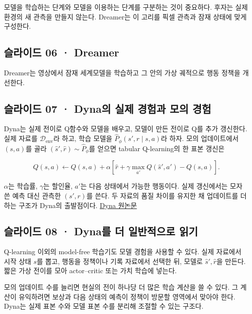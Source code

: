 \documentclass[11pt,a4paper]{article}
\begin{document}
모델을 학습하는 단계와 모델을 이용하는 단계를 구분하는 것이 중요하다. 후자는 실제 환경의 새 관측을 만들지 않는다. Dreamer는 이 고리를 픽셀 관측과 잠재 상태에 맞게 구성한다.\par

\subsection{슬라이드 06 · Dreamer}

Dreamer는 영상에서 잠재 세계모델을 학습하고 그 안의 가상 궤적으로 행동 정책을 개선한다.\par

\subsection{슬라이드 07 · Dyna의 실제 경험과 모의 경험}

Dyna는 실제 전이로 Q함수와 모델을 배우고, 모델이 만든 전이로 Q를 추가 갱신한다. 실제 자료를 $\mathcal D_{\mathrm{env}}$라 하고, 학습 모델을 $\hat P_\phi(s',r\mid s,a)$라 하자. 모의 업데이트에서 $(s,a)$를 골라 $(\hat s',\hat r)\sim\hat P_\phi$를 얻으면 tabular Q-learning의 한 표본 갱신은\par

\[
Q(s,a)\leftarrow Q(s,a)+\alpha
\left[\hat r+\gamma\max_{a'}Q(\hat s',a')-Q(s,a)\right].
\]

$\alpha$는 학습률, $\gamma$는 할인율, $a'$는 다음 상태에서 가능한 행동이다. 실제 갱신에서는 모자 쓴 예측 대신 관측한 $(s',r)$를 쓴다. 두 자료의 품질 차이를 유지한 채 업데이트를 더하는 구조가 Dyna의 출발점이다. \href{https://doi.org/10.1145/122344.122377}{Dyna 원논문}\par

\subsection{슬라이드 08 · Dyna를 더 일반적으로 읽기}

Q-learning 이외의 model-free 학습기도 모델 경험을 사용할 수 있다. 실제 자료에서 시작 상태 $s$를 뽑고, 행동을 정책이나 기록 자료에서 선택한 뒤, 모델로 $\hat s',\hat r$을 만든다. 짧은 가상 전이를 모아 actor–critic 또는 가치 학습에 넣는다.\par

모의 업데이트 수를 늘리면 현실의 전이 하나당 더 많은 학습 계산을 쓸 수 있다. 그 계산이 유익하려면 보상과 다음 상태의 예측이 정책이 방문할 영역에서 맞아야 한다. Dyna는 실제 표본 수와 모델 표본 수를 분리해 조절할 수 있는 구조다.\par
\end{document}
